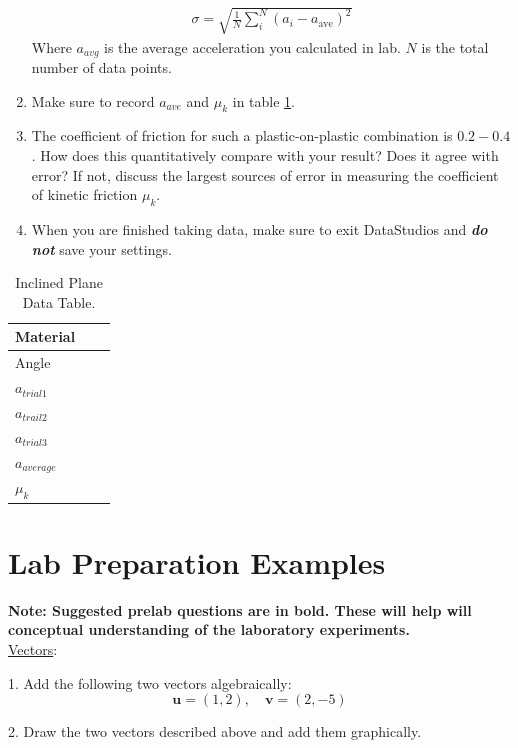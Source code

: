 \begin{enumerate}
\begin{gather}
\sigma = \sqrt{\frac{1}{N}\sum_{i}^{N} (a_i - a_{\text{ave}})^2}
\end{gather}
Where $a_{avg}$ is the average acceleration you calculated in lab. $N$ is the total number of data points.
\item  Make sure to record $a_{ave}$ and $\mu_k$ in table \ref{planedatatable}.
     \item The coefficient of friction for such a plastic-on-plastic combination is $0.2-0.4$.  How does this quantitatively compare with your result? Does it agree with error? If not, discuss the largest sources of error in measuring the coefficient of kinetic friction $\mu_k$.
    \item When you are finished taking data, make sure to exit DataStudios and {\bf{\it{do not}}} save your settings.
\end{enumerate}

\begin{table}
\begin{center}
\begin{tabular}{|l |p{5 cm}| p{5 cm} |}
\hline
	Material &  \\
	\hline
	Angle& \\
	\hline
	$a_{trial 1}$& \\
	\hline
	$a_{trail 2}$& \\
	\hline
	$a_{trial 3}$& \\
	\hline
	$a_{average}$& \\
	\hline
	$\mu_k$& \\
	\hline
\end{tabular}
\end{center}
\caption{Inclined Plane Data Table.}
\label{planedatatable}
\end{table}

\section{Lab Preparation Examples}
{\bf{Note: Suggested prelab questions are in bold. These will help will conceptual understanding of the laboratory experiments.}}
\\
\noindent \underline{Vectors}:\myskip

1. Add the following two vectors algebraically:
\begin{equation*}
    \mathbf{u} = (1,2),\quad \mathbf{v} = (2,-5)
\end{equation*}

2. Draw the two vectors described above and add them graphically. \myskip

